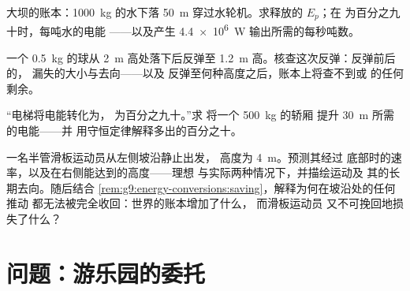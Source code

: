 \begin{exercise}[$\star\star$]\label{exo:g9:energy-conversions:9}
大坝的账本：\qty{1000}{kg} 的水下落 \qty{50}{m}
穿过水轮机。求释放的 $E_p$；在
为百分之九十时，每吨水的电能
——以及产生
\qty{4.4e6}{W} 输出所需的每秒吨数。
\end{exercise}

\begin{exercise}[$\star\star$]\label{exo:g9:energy-conversions:10}
一个 \qty{0.5}{kg} 的球从 \qty{2}{m} 高处落下后反弹至
\qty{1.2}{m} 高。核查这次反弹：反弹前后的，
漏失的大小与去向——以及
反弹至何种高度之后，账本上将查不到或
的任何剩余。
\end{exercise}

\begin{exercise}[$\star\star$]\label{exo:g9:energy-conversions:11}
“电梯将电能转化为，
为百分之九十。”求
将一个 \qty{500}{kg} 的轿厢
提升 \qty{30}{m} 所需的电能——并
用守恒定律解释多出的百分之十。
\end{exercise}

\begin{exercise}[$\star\star\star$]\label{exo:g9:energy-conversions:12}
一名半管滑板运动员从左侧坡沿静止出发，
高度为 \qty{4}{m}。预测其经过
底部时的速率，以及在右侧能达到的高度——理想
与实际两种情况下，并描绘运动及
其的长期去向。随后结合
\cref{rem:g9:energy-conversions:saving}，解释为何在坡沿处的任何推动
都无法被完全收回：世界的账本增加了什么，
而滑板运动员
又不可挽回地损失了什么？
\end{exercise}

\section{问题：游乐园的委托}

